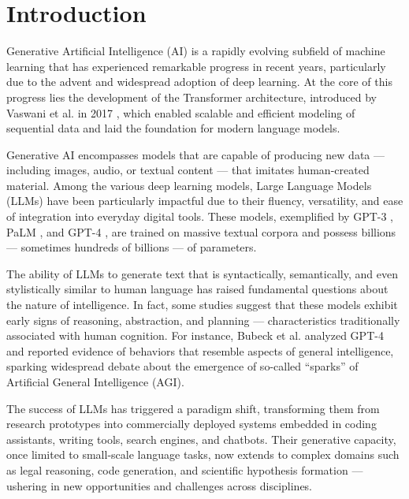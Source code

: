 \clearpage
\chapter{Introduction}



Generative Artificial Intelligence (AI) is a rapidly evolving subfield of machine learning that has experienced remarkable progress in recent years, particularly due to the advent and widespread adoption of deep learning. At the core of this progress lies the development of the Transformer architecture, introduced by Vaswani et al. in 2017 \cite{vaswani2017attention}, which enabled scalable and efficient modeling of sequential data and laid the foundation for modern language models.

Generative AI encompasses models that are capable of producing new data — including images, audio, or textual content — that imitates human-created material. Among the various deep learning models, Large Language Models (LLMs) have been particularly impactful due to their fluency, versatility, and ease of integration into everyday digital tools. These models, exemplified by GPT-3 \cite{brown2020language}, PaLM \cite{chowdhery2022palm}, and GPT-4 \cite{openai2023gpt4}, are trained on massive textual corpora and possess billions — sometimes hundreds of billions — of parameters.

The ability of LLMs to generate text that is syntactically, semantically, and even stylistically similar to human language has raised fundamental questions about the nature of intelligence. In fact, some studies suggest that these models exhibit early signs of reasoning, abstraction, and planning — characteristics traditionally associated with human cognition. For instance, Bubeck et al. \cite{bubeck2023sparks} analyzed GPT-4 and reported evidence of behaviors that resemble aspects of general intelligence, sparking widespread debate about the emergence of so-called “sparks” of Artificial General Intelligence (AGI).

The success of LLMs has triggered a paradigm shift, transforming them from research prototypes into commercially deployed systems embedded in coding assistants, writing tools, search engines, and chatbots. Their generative capacity, once limited to small-scale language tasks, now extends to complex domains such as legal reasoning, code generation, and scientific hypothesis formation — ushering in new opportunities and challenges across disciplines.




